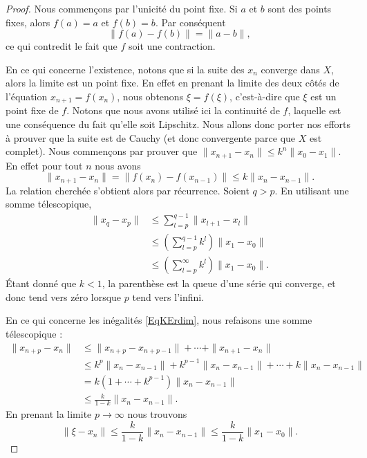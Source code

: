 \begin{proof}

    Nous commençons par l'unicité du point fixe. Si \( a\) et \( b\) sont des points fixes, alors \( f(a)=a\) et \( f(b)=b\). Par conséquent
    \begin{equation}
        \| f(a)-f(b) \|=\| a-b \|,
    \end{equation}
    ce qui contredit le fait que \( f\) soit une contraction.

    En ce qui concerne l'existence, notons que si la suite des \( x_n\) converge dans \( X\), alors la limite est un point fixe. En effet en prenant la limite des deux côtés de l'équation \( x_{n+1}=f(x_n)\), nous obtenons \( \xi=f(\xi)\), c'est-à-dire que \( \xi\) est un point fixe de \( f\). Notons que nous avons utilisé ici la continuité de \( f\), laquelle est une conséquence du fait qu'elle soit Lipschitz. Nous allons donc porter nos efforts à prouver que la suite est de Cauchy (et donc convergente parce que \( X\) est complet). Nous commençons par prouver que \( \| x_{n+1}-x_n \|\leq k^n\| x_0-x_1 \|\). En effet pour tout \( n\) nous avons
    \begin{equation}
        \| x_{n+1}-x_n \|=\| f(x_n)-f(x_{n-1}) \|\leq k\| x_n-x_{n-1} \|.
    \end{equation}
    La relation cherchée s'obtient alors par récurrence. Soient \( q>p\). En utilisant une somme télescopique,
    \begin{subequations}
        \begin{align}
            \| x_q-x_p \|&\leq \sum_{l=p}^{q-1}\| x_{l+1}-x_l \|\\
            &\leq\left( \sum_{l=p}^{q-1}k^l \right)\| x_1-x_0 \|\\
            &\leq\left(\sum_{l=p}^{\infty}k^l\right)\| x_1-x_0 \|.
        \end{align}
    \end{subequations}
    Étant donné que \( k<1\), la parenthèse est la queue d'une série qui converge, et donc tend vers zéro lorsque \( p\) tend vers l'infini.

    En ce qui concerne les inégalités \eqref{EqKErdim}, nous refaisons une somme télescopique :
    \begin{subequations}
        \begin{align}
            \| x_{n+p}-x_n \|&\leq \| x_{n+p}-x_{n+p-1} \|+\cdots +\| x_{n+1}-x_n \|\\
            &\leq k^p\| x_n-x_{n-1} \|+k^{p-1}\| x_n-x_{n-1} \|+\cdots +k\| x_n-x_{n-1} \|\\
            &=k(1+\cdots +k^{p-1})\| x_n-x_{n-1}\|  \\
            &\leq \frac{ k }{ 1-k }\| x_n-x_{n-1} \|.
        \end{align}
    \end{subequations}
    En prenant la limite \( p\to \infty\) nous trouvons
    \begin{equation}        \label{EqlUMVGW}
        \| \xi-x_n \|\leq \frac{ k }{ 1-k }\| x_n-x_{n-1} \|\leq \frac{ k }{ 1-k }\| x_1-x_0 \|.
    \end{equation}


\end{proof}
